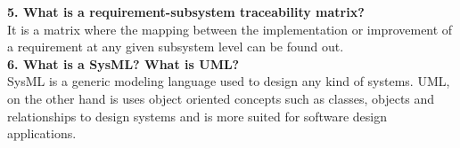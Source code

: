 \documentclass[12pt,letterpaper,titlepage,en-US]{article}
\begin{document}
    
    
    \textbf{5. What is a requirement-subsystem traceability matrix?}\\
    It is a matrix where the mapping between the implementation or improvement of a requirement at any given subsystem level can be found out.\\
    
    
    
   \textbf {6. What is a SysML? What is UML?}\\
  SysML is  a generic modeling language used to design any kind of systems.  UML, on the other hand is uses object oriented concepts such as classes, objects and relationships to design systems and is more suited for software design applications.
\end{document}
